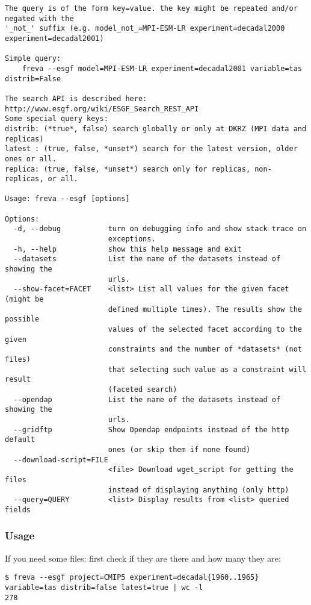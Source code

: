 \documentclass[a4paper,11pt]{ltxdoc}
\begin{document}
\begin{lstlisting}
The query is of the form key=value. the key might be repeated and/or negated with the 
'_not_' suffix (e.g. model_not_=MPI-ESM-LR experiment=decadal2000 experiment=decadal2001)

Simple query:
    freva --esgf model=MPI-ESM-LR experiment=decadal2001 variable=tas distrib=False

The search API is described here: http://www.esgf.org/wiki/ESGF_Search_REST_API
Some special query keys:
distrib: (*true*, false) search globally or only at DKRZ (MPI data and replicas)
latest : (true, false, *unset*) search for the latest version, older ones or all.
replica: (true, false, *unset*) search only for replicas, non-replicas, or all.

Usage: freva --esgf [options]

Options:
  -d, --debug           turn on debugging info and show stack trace on
                        exceptions.
  -h, --help            show this help message and exit
  --datasets            List the name of the datasets instead of showing the
                        urls.
  --show-facet=FACET    <list> List all values for the given facet (might be
                        defined multiple times). The results show the possible
                        values of the selected facet according to the given
                        constraints and the number of *datasets* (not files)
                        that selecting such value as a constraint will result
                        (faceted search)
  --opendap             List the name of the datasets instead of showing the
                        urls.
  --gridftp             Show Opendap endpoints instead of the http default
                        ones (or skip them if none found)
  --download-script=FILE
                        <file> Download wget_script for getting the files
                        instead of displaying anything (only http)
  --query=QUERY         <list> Display results from <list> queried fields

\end{lstlisting}
\subsubsection*{Usage}
If you need some files: first check if they are there and how many they are:
\begin{lstlisting}
$ freva --esgf project=CMIP5 experiment=decadal{1960..1965} variable=tas distrib=false latest=true | wc -l
278
\end{lstlisting}
\end{document}
